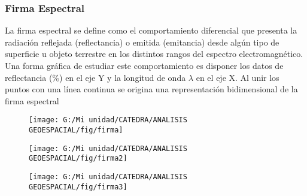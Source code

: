 \documentclass[14pt]{beamer}
\begin{document}
\begin{frame}
  \begin{figure}
    \centering
    \qquad
    \label{fig:1}
  \end{figure}
  \begin{figure}
    \centering
    \qquad    
    \label{fig:2}
  \end{figure}
\end{frame}
 \begin{frame}
\frametitle{Firma Espectral}
\scriptsize{La firma espectral se define como el comportamiento diferencial que presenta la radiación reflejada (reflectancia) o emitida (emitancia) desde algún tipo de superficie u objeto terrestre en los distintos rangos del espectro electromagnético. Una forma gráfica de estudiar este comportamiento es disponer los datos de reflectancia (\%) en el eje Y y la longitud de onda $\lambda$ en el eje X. Al unir los puntos con una línea continua se origina una representación bidimensional de la firma espectral}
 \begin{figure}
    \centering
    \texttt{[image: G:/Mi unidad/CATEDRA/ANALISIS GEOESPACIAL/fig/firma]}
  \end{figure}
\end{frame}
\begin{frame}
  \begin{figure}
    \centering
    \texttt{[image: G:/Mi unidad/CATEDRA/ANALISIS GEOESPACIAL/fig/firma2]}
  \end{figure}
\end{frame}
\begin{frame}
  \begin{figure}
    \centering
    \texttt{[image: G:/Mi unidad/CATEDRA/ANALISIS GEOESPACIAL/fig/firma3]}
  \end{figure}
\end{frame}
\end{document}
